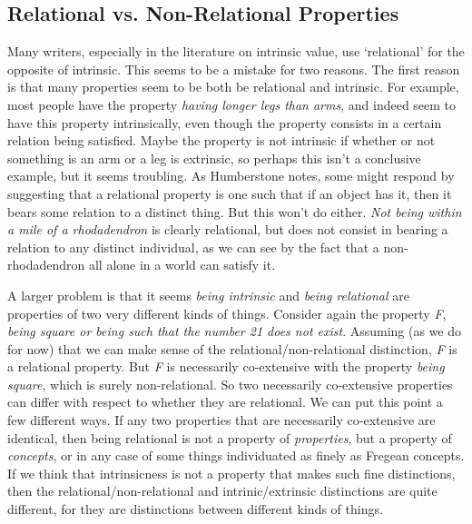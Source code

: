 \subsection{Relational vs. Non-Relational Properties}
Many writers, especially in the literature on intrinsic value, use `relational' for the opposite of intrinsic. This seems to be a mistake for two reasons. The first reason is that many properties seem to be both be relational and intrinsic. For example, most people have the property \textit{having longer legs than arms}, and indeed seem to have this property intrinsically, even though the property consists in a certain relation being satisfied. Maybe the property is not intrinsic if whether or not something is an arm or a leg is extrinsic, so perhaps this isn't a conclusive example, but it seems troubling. As Humberstone notes, some might respond by suggesting that a relational property is one such that if an object has it, then it bears some relation to a distinct thing. But this won't do either. \textit{Not being within a mile of a rhodadendron} is clearly relational, but does not consist in bearing a relation to any distinct individual, as we can see by the fact that a non-rhodadendron all alone in a world can satisfy it.

A larger problem is that it seems \textit{being intrinsic} and \textit{being relational} are properties of two very different kinds of things. Consider again the property \textit{F}, \textit{being square or being such that the number 21 does not exist}. Assuming (as we do for now) that we can make sense of the relational/non-relational distinction, \textit{F} is a relational property. But \textit{F} is necessarily co-extensive with the property \textit{being square}, which is surely non-relational. So two necessarily co-extensive properties can differ with respect to whether they are relational. We can put this point a few different ways. If any two properties that are necessarily co-extensive are identical, then being relational is not a property of \textit{properties}, but a property of \textit{concepts}, or in any case of some things individuated as finely as Fregean concepts. If we think that intrinsicness is not a property that makes such fine distinctions, then the relational/non-relational and intrinic/extrinsic distinctions are quite different, for they are distinctions between different kinds of things.

